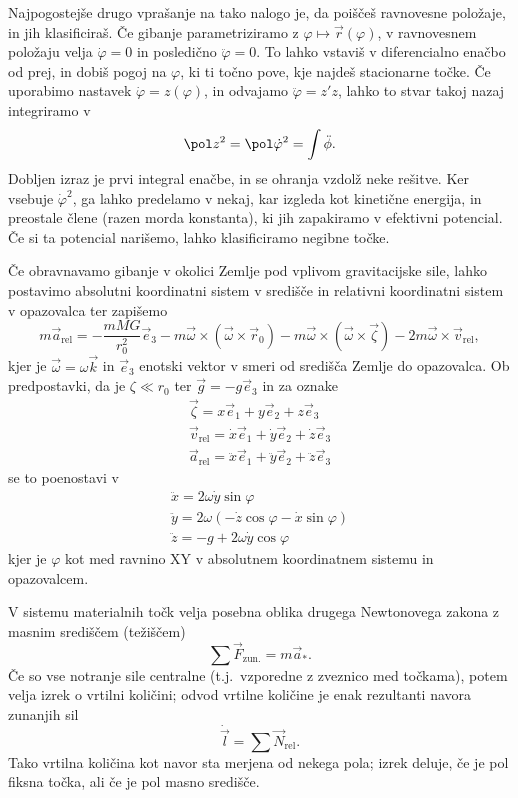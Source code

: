 Najpogostejše drugo vprašanje na tako nalogo je, da poiščeš ravnovesne položaje,
in jih klasificiraš.
Če gibanje parametriziramo z $\varphi \mapsto \vec{r}(\varphi)$, v ravnovesnem
položaju velja $\dot{\varphi} = 0$ in posledično $\ddot{\varphi} = 0$.
To lahko vstaviš v diferencialno enačbo od prej, in dobiš pogoj na $\varphi$, ki
ti točno pove, kje najdeš stacionarne točke.
Če uporabimo nastavek $\dot{\varphi} = z(\varphi)$, in odvajamo $\ddot{\varphi}
= z' z$, lahko to stvar takoj nazaj integriramo v
\[
  \pol z^2 = \pol \dot{\varphi}^2 = \int \ddot{\phi}.
\]
Dobljen izraz je prvi integral enačbe, in se ohranja vzdolž neke rešitve.
Ker vsebuje $\dot{\varphi}^2$, ga lahko predelamo v nekaj, kar izgleda kot
kinetične energija, in preostale člene (razen morda konstanta), ki jih
zapakiramo v efektivni potencial.
Če si ta potencial narišemo, lahko klasificiramo negibne točke.

Če obravnavamo gibanje v okolici Zemlje pod vplivom gravitacijske sile, lahko
postavimo absolutni koordinatni sistem v središče in relativni koordinatni
sistem v opazovalca ter zapišemo
\[
  m \vec{a}_{\text{rel}} = - \frac{mMG}{r_0^2} \vec{e}_3 - m \vec{\omega} \times
  (\vec{\omega} \times \vec{r}_0) - m \vec{\omega} \times (\vec{\omega} \times
  \vec{\zeta}) - 2m \vec{\omega} \times \vec{v}_{\text{rel}},
\]
kjer je $\vec{\omega} = \omega \vec{k}$ in $\vec{e}_3$
enotski vektor v smeri od središča Zemlje do opazovalca.
Ob predpostavki, da je $\zeta \ll r_0$ ter $\vec{g} = -g \vec{e}_3$ in za
oznake
\begin{gather*}
  \vec{\zeta} = x \vec{e}_1 + y \vec{e}_2 + z \vec{e}_3 \\
  \vec{v}_{\text{rel}} = \dot{x} \vec{e}_1 + \dot{y} \vec{e}_2 + \dot{z}
  \vec{e}_3 \\
  \vec{a}_{\text{rel}} = \ddot{x} \vec{e}_1 + \ddot{y} \vec{e}_2 + \ddot{z}
  \vec{e}_3
\end{gather*}
se to poenostavi v
\begin{gather*}
  \ddot{x} = 2 \omega \dot{y} \sin \varphi \\
  \ddot{y} = 2 \omega (- \dot{z} \cos \varphi - \dot{x} \sin \varphi) \\
  \ddot{z} = -g + 2 \omega \dot{y} \cos \varphi
\end{gather*}
kjer je $\varphi$ kot med ravnino XY v absolutnem koordinatnem sistemu in opazovalcem.


V sistemu materialnih točk velja posebna oblika drugega Newtonovega zakona z
masnim središčem (težiščem)
\[
  \sum \vec{F}_{\text{zun.}} = m \vec{a}_*.
\]
Če so vse notranje sile centralne (t.j.~vzporedne z zveznico med točkama), potem
velja izrek o vrtilni količini; odvod vrtilne količine je enak rezultanti navora
zunanjih sil
\[
  \dot{\vec{l}} = \sum \vec{N}_{\text{rel}}.
\]
Tako vrtilna količina kot navor sta merjena od nekega pola; izrek deluje, če je
pol fiksna točka, ali če je pol masno središče.


